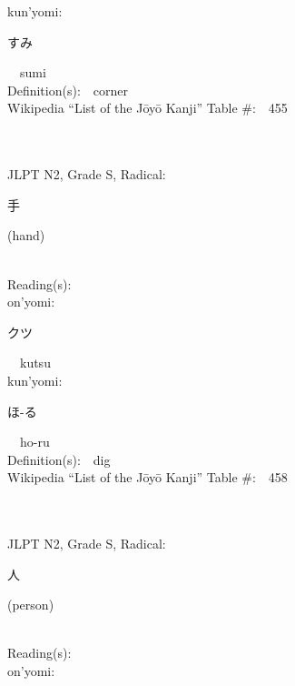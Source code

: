 \begin{multicols}{2}
{\hspace*{1em}}kun'yomi:\ \ \\
{\hspace*{2em}}{\begin{CJK}{UTF8}{min} すみ \end{CJK}}\ \ sumi\ \ \\
Definition(s):\ \ corner \\
Wikipedia ``List of the J\=oy\=o Kanji'' Table \#:\ \ 455 \\
\ \ \\
{\fontsize{34pt}{40pt}  }\ \ \\  %
{JLPT N2, Grade S, Radical:\ \ {\begin{CJK}{UTF8}{min} 手 \end{CJK}} (hand) } \\
Reading(s):\ \ \\
{\hspace*{1em}}on'yomi:\ \ \\
{\hspace*{2em}}{\begin{CJK}{UTF8}{min} クツ \end{CJK}}\ \ kutsu\ \ \\
{\hspace*{1em}}kun'yomi:\ \ \\
{\hspace*{2em}}{\begin{CJK}{UTF8}{min} ほ-る \end{CJK}}\ \ ho-ru\ \ \\
Definition(s):\ \ dig \\
Wikipedia ``List of the J\=oy\=o Kanji'' Table \#:\ \ 458 \\
\ \ \\
{\fontsize{34pt}{40pt}  }\ \ \\  %
{JLPT N2, Grade S, Radical:\ \ {\begin{CJK}{UTF8}{min} 人 \end{CJK}} (person) } \\
Reading(s):\ \ \\
{\hspace*{1em}}on'yomi:\ \ \\

\end{multicols}
